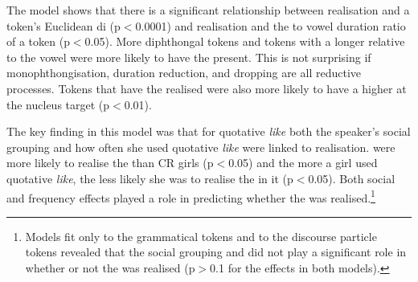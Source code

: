 \largerpage[-1]
The model shows that there is a significant relationship between  realisation and a token's Euclidean di (p$<$0.0001) and  realisation and the  to vowel duration ratio of a token (p$<$0.05). More diphthongal tokens and tokens with a longer  relative to the vowel were more likely to have the  present. This is not surprising if monophthongisation,  duration reduction, and  dropping are all reductive processes. Tokens that have the  realised were also more likely to have a higher  at the nucleus target (p$<$0.01).

The key finding in this mo\-del was that for quotative \textit{like} both the spea\-ker's social grouping and how often she used quotative \textit{like} were linked to  realisation.  were more likely to realise the  than CR girls (p$<$0.05) and the more a girl used quotative \textit{like}, the less likely she was to realise the  in it (p$<$0.05). Both social and frequency effects played a role in predicting whether the  was realised.\footnote{Models fit only to the grammatical tokens and to the discourse particle tokens revealed that the social grouping and  did not play a significant role in whether or not the  was realised (p$>$0.1 for the effects in both models).}




